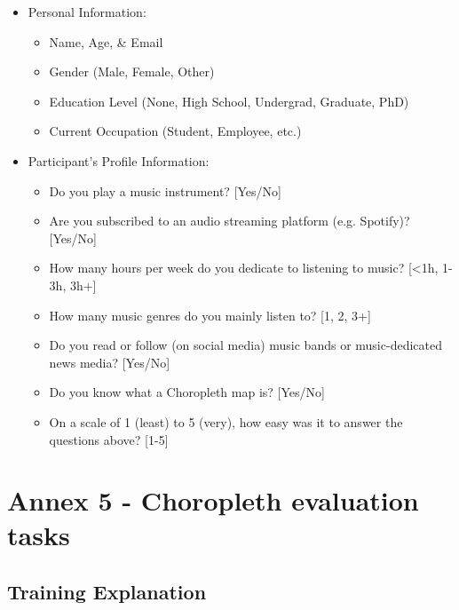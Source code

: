 \documentclass[twocolumn, letterpaper,13pt]{scrartcl}
\begin{document}
    \begin{itemize}
        \item Personal Information:
        \begin{itemize}
            \item Name, Age, \& Email 
            \item Gender (Male, Female, Other)
            \item Education Level (None, High School, Undergrad, Graduate, PhD)
            \item Current Occupation (Student, Employee, etc.)
        \end{itemize}
        \item Participant's Profile Information:
        \begin{itemize}
            \item Do you play a music instrument? [Yes/No]
            \item Are you subscribed to an audio streaming platform (e.g. Spotify)? [Yes/No]
            \item How many hours per week do you dedicate to listening to music? [<1h, 1-3h, 3h+]
            \item How many music genres do you mainly listen to? [1, 2, 3+]
            \item Do you read or follow (on social media) music bands or music-dedicated news media? [Yes/No]
            \item Do you know what a Choropleth map is? [Yes/No]
            \item On a scale of 1 (least) to 5 (very), how easy was it to answer the questions above? [1-5]
        \end{itemize}
    \end{itemize}
    
    \section*{Annex 5 - Choropleth evaluation tasks}
    
    \subsection*{Training Explanation}
    
\end{document}
